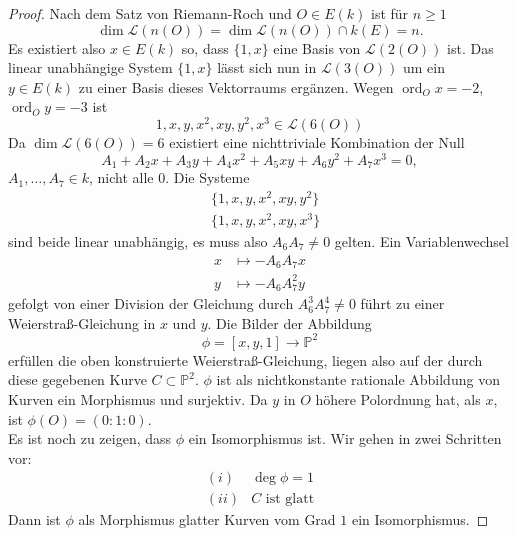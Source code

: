 \documentclass{amsart}
\makeatletter
\theoremstyle{plain}
\theoremstyle{definition}
\newcommand{\projspace}{\mathds{P}}
\newcommand{\riemannspace}{\mathcal{L}}
\newcommand{\ord}{\operatorname{ord}}
\newcommand{\mathleft}{\@fleqntrue\@mathmargin20pt}
\newcommand{\mathcenter}{\@fleqnfalse}
\makeatother
\begin{document}
\begin{proof}
	Nach dem Satz von Riemann-Roch und $O \in E(k)$ ist für $n \geq 1$
	\begin{equation*}
		\dim \riemannspace(n(O)) = \dim \riemannspace(n(O)) \cap k(E) = n.
	\end{equation*}
	Es existiert also $x \in E(k)$ so, dass $\{1, x\}$ eine Basis von $\riemannspace(2(O))$ ist.
	Das linear unabhängige System $\{1, x\}$ lässt sich nun in $\riemannspace(3(O))$ um ein $y \in E(k)$ zu einer Basis dieses Vektorraums ergänzen.
	Wegen $\ord_O x = -2$, $\ord_O y = -3$ ist
	\begin{equation*}
		1, x, y, x^2, xy, y^2, x^3 \in \riemannspace(6(O))
	\end{equation*}
	Da $\dim \riemannspace(6(O)) = 6$ existiert eine nichttriviale Kombination der Null
	\begin{equation*}
		A_1 + A_2 x + A_3 y + A_4 x^2 + A_5 x y + A_6 y^2 + A_7 x^3 = 0,
	\end{equation*}
	$A_1, \dots, A_7 \in k$, nicht alle $0$.
	Die Systeme
	\begin{align*}
		& \{1, x, y, x^2, xy, y^2\} \\
		& \{1, x, y, x^2, xy, x^3\}
	\end{align*}
	sind beide linear unabhängig, es muss also $A_6 A_7 \neq 0$ gelten.
	Ein Variablenwechsel
	\begin{align*}
		x & \mapsto -A_6A_7 x \\
		y & \mapsto -A_6A_7^2 y
	\end{align*}
	gefolgt von einer Division der Gleichung durch $A_6^3A_7^4 \neq 0$ führt zu einer Weierstraß-Gleichung in $x$ und $y$.
	Die Bilder der Abbildung
	\begin{equation*}
		\phi = [x, y, 1] \rightarrow \projspace^2
	\end{equation*}
	erfüllen die oben konstruierte Weierstraß-Gleichung, liegen also auf der durch diese gegebenen Kurve $C \subset \projspace^2$.
	$\phi$ ist als nichtkonstante rationale Abbildung von Kurven ein Morphismus und surjektiv.
	Da $y$ in $O$ höhere Polordnung hat, als $x$, ist $\phi(O) = (0 : 1 : 0)$. \\
	Es ist noch zu zeigen, dass $\phi$ ein Isomorphismus ist. Wir gehen in zwei Schritten vor: 
	\mathleft
		\begin{equation*}
			\begin{array}{ll}
				(i) & \deg \phi = 1 \\
				(ii) & C \text{ ist glatt}
			\end{array}
		\end{equation*}
	\mathcenter
	Dann ist $\phi$ als Morphismus glatter Kurven vom Grad $1$ ein Isomorphismus.


\end{proof}
\end{document}
